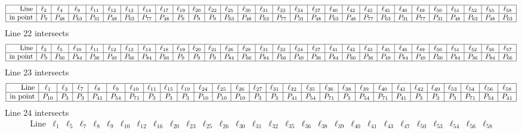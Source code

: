 \documentclass{article}
\begin{document}
{$$\begin{array}{|r*{28}{|c}|}
\hline
\mbox{Line}  & \ell_{2} & \ell_{4} & \ell_{9} & \ell_{11} & \ell_{12} & \ell_{13} & \ell_{14} & \ell_{17} & \ell_{19} & \ell_{20} & \ell_{22} & \ell_{25} & \ell_{30} & \ell_{31} & \ell_{33} & \ell_{34} & \ell_{37} & \ell_{40} & \ell_{42} & \ell_{43} & \ell_{45} & \ell_{46} & \ell_{49} & \ell_{50} & \ell_{51} & \ell_{52} & \ell_{55} & \ell_{58}\\
\hline
\mbox{in point}  & P_{9} & P_{48} & P_{63} & P_{31} & P_{48} & P_{63} & P_{77} & P_{48} & P_{9} & P_{9} & P_{9} & P_{63} & P_{48} & P_{63} & P_{77} & P_{31} & P_{48} & P_{63} & P_{48} & P_{77} & P_{63} & P_{31} & P_{77} & P_{31} & P_{48} & P_{63} & P_{48} & P_{63}\\
\hline
\end{array}
$$
Line 22 intersects 
$$
\begin{array}{|r*{28}{|c}|}
\hline
\mbox{Line}  & \ell_{2} & \ell_{5} & \ell_{10} & \ell_{11} & \ell_{12} & \ell_{13} & \ell_{14} & \ell_{18} & \ell_{19} & \ell_{20} & \ell_{21} & \ell_{26} & \ell_{28} & \ell_{31} & \ell_{33} & \ell_{34} & \ell_{37} & \ell_{41} & \ell_{42} & \ell_{43} & \ell_{45} & \ell_{46} & \ell_{49} & \ell_{50} & \ell_{51} & \ell_{52} & \ell_{56} & \ell_{57}\\
\hline
\mbox{in point}  & P_{9} & P_{66} & P_{84} & P_{36} & P_{49} & P_{66} & P_{84} & P_{66} & P_{9} & P_{9} & P_{9} & P_{84} & P_{66} & P_{84} & P_{66} & P_{49} & P_{36} & P_{84} & P_{66} & P_{36} & P_{49} & P_{84} & P_{49} & P_{66} & P_{84} & P_{36} & P_{84} & P_{66}\\
\hline
\end{array}
$$
Line 23 intersects 
$$
\begin{array}{|r*{27}{|c}|}
\hline
\mbox{Line}  & \ell_{1} & \ell_{3} & \ell_{7} & \ell_{8} & \ell_{9} & \ell_{10} & \ell_{11} & \ell_{15} & \ell_{19} & \ell_{24} & \ell_{25} & \ell_{26} & \ell_{27} & \ell_{31} & \ell_{32} & \ell_{35} & \ell_{36} & \ell_{38} & \ell_{39} & \ell_{40} & \ell_{41} & \ell_{42} & \ell_{49} & \ell_{53} & \ell_{54} & \ell_{56} & \ell_{58}\\
\hline
\mbox{in point}  & P_{10} & P_{3} & P_{3} & P_{41} & P_{54} & P_{71} & P_{3} & P_{3} & P_{3} & P_{10} & P_{10} & P_{10} & P_{3} & P_{3} & P_{41} & P_{54} & P_{71} & P_{3} & P_{54} & P_{71} & P_{41} & P_{3} & P_{3} & P_{3} & P_{71} & P_{54} & P_{41}\\
\hline
\end{array}
$$
Line 24 intersects 
$$
\begin{array}{|r*{28}{|c}|}
\hline
\mbox{Line}  & \ell_{1} & \ell_{5} & \ell_{7} & \ell_{8} & \ell_{9} & \ell_{10} & \ell_{12} & \ell_{16} & \ell_{20} & \ell_{23} & \ell_{25} & \ell_{26} & \ell_{30} & \ell_{31} & \ell_{32} & \ell_{35} & \ell_{36} & \ell_{38} & \ell_{39} & \ell_{40} & \ell_{41} & \ell_{43} & \ell_{47} & \ell_{50} & \ell_{53} & \ell_{54} & \ell_{56} & \ell_{58}\\

\end{array}$$}
\end{document}
